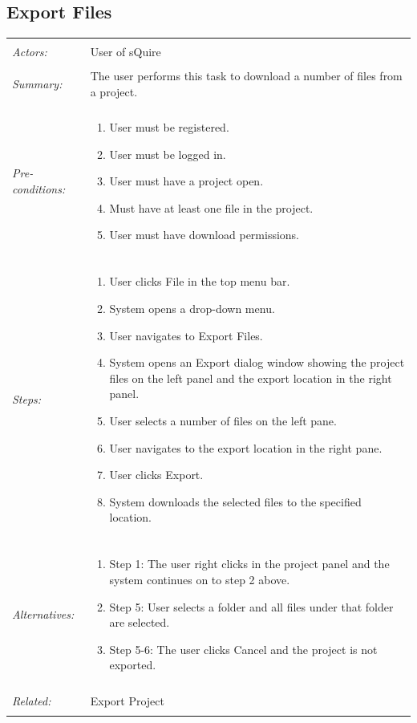 \documentclass[11pt]{report}
\begin{document}
\subsection{Export Files}
\begin{tabular}{ p{2cm} p{12cm} }
\hline
	\\
	\textit{Actors:} & User of sQuire \\
	\\
	\textit{Summary:} & The user performs this task to download a number of files from a project. \\
	\\
	\textit{Pre-conditions:} &  \begin{enumerate}
		\item User must be registered.
		\item User must be logged in.
		\item User must have a project open.
		\item Must have at least one file in the project.
		\item User must have download permissions.
	\end{enumerate} \\
	\\
	\textit{Steps:} & \begin{enumerate}
		\item User clicks File in the top menu bar.
		\item System opens a drop-down menu.
		\item User navigates to Export Files.
		\item System opens an Export dialog window showing the project files on the left panel and the export location in the right panel.
		\item User selects a number of files on the left pane.
		\item User navigates to the export location in the right pane.
		\item User clicks Export.
		\item System downloads the selected files to the specified location.
	\end{enumerate} \\
	\\
	\textit{Alternatives:} & \begin{enumerate}
		\item Step 1: The user right clicks in the project panel and the system continues on to step 2 above.
		\item Step 5: User selects a folder and all files under that folder are selected.
		\item Step 5-6: The user clicks Cancel and the project is not exported.
	\end{enumerate} \\
	\\
	\textit{Related:} & Export Project \\
	\\
\hline
\end{tabular}
\newpage
\end{document}
